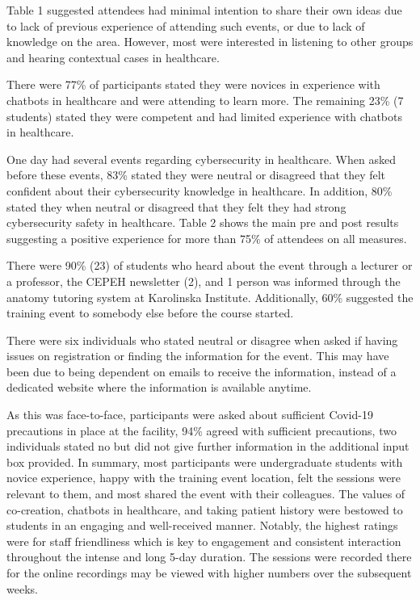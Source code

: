 \documentclass[a4paper, nobind]{templates/ociamthesis}
\begin{document}
Table 1 suggested attendees had minimal intention to share their own ideas due to lack of previous experience of attending such events, or due to lack of knowledge on the area. However, most were interested in listening to other groups and hearing contextual cases in healthcare.

There were 77\% of participants stated they were novices in experience with chatbots in healthcare and were attending to learn more. The remaining 23\% (7 students) stated they were competent and had limited experience with chatbots in healthcare.

One day had several events regarding cybersecurity in healthcare. When asked before these events, 83\% stated they were neutral or disagreed that they felt confident about their cybersecurity knowledge in healthcare. In addition, 80\% stated they when neutral or disagreed that they felt they had strong cybersecurity safety in healthcare. Table 2 shows the main pre and post results suggesting a positive experience for more than 75\% of attendees on all measures.

There were 90\% (23) of students who heard about the event through a lecturer or a professor, the CEPEH newsletter (2), and 1 person was informed through the anatomy tutoring system at Karolinska Institute. Additionally, 60\% suggested the training event to somebody else before the course started.

There were six individuals who stated neutral or disagree when asked if having issues on registration or finding the information for the event. This may have been due to being dependent on emails to receive the information, instead of a dedicated website where the information is available anytime.

As this was face-to-face, participants were asked about sufficient Covid-19 precautions in place at the facility, 94\% agreed with sufficient precautions, two individuals stated no but did not give further information in the additional input box provided.
In summary, most participants were undergraduate students with novice experience, happy with the training event location, felt the sessions were relevant to them, and most shared the event with their colleagues. The values of co-creation, chatbots in healthcare, and taking patient history were bestowed to students in an engaging and well-received manner. Notably, the highest ratings were for staff friendliness which is key to engagement and consistent interaction throughout the intense and long 5-day duration. The sessions were recorded there for the online recordings may be viewed with higher numbers over the subsequent weeks.
\end{document}
